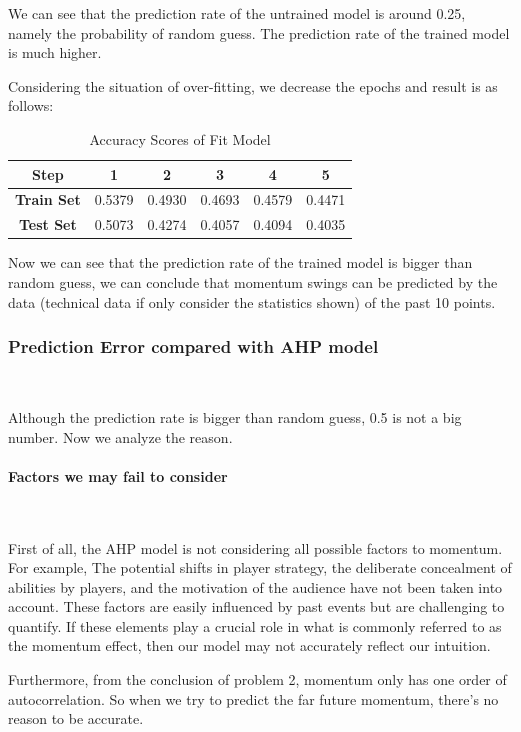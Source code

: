 We can see that the prediction rate of the untrained model is around 0.25,
namely the probability of random guess. 
The prediction rate of the trained model is much higher.

Considering the situation of over-fitting, we decrease the epochs and result is as follows:

\begin{table}[H]
    \centering
    \begin{tabular}{cccccc}
        \toprule
        \textbf{Step} & \textbf{1} & \textbf{2} & \textbf{3} & \textbf{4} & \textbf{5} \\
        \midrule
        \textbf{Train Set} & 0.5379 & 0.4930 & 0.4693 & 0.4579 & 0.4471 \\
        \textbf{Test Set} & 0.5073 & 0.4274 & 0.4057 & 0.4094 & 0.4035 \\
        \bottomrule
    \end{tabular}
    \caption{Accuracy Scores of Fit Model}
    \label{tab:predict_rate_fit}
\end{table}

Now we can see that the prediction rate of the trained model is bigger than random guess,
we can conclude that momentum swings can be predicted by the data 
(technical data if only consider the statistics shown) of the past 10 points.


\subsubsection{Prediction Error compared with AHP model}~{}

Although the prediction rate is bigger than random guess, 0.5 is not a big number.
Now we analyze the reason.

\paragraph{Factors we may fail to consider}~{}

First of all, the AHP model is not considering all possible factors to momentum.
For example, The potential shifts in player strategy, the deliberate concealment of abilities by players,
and the motivation of the audience have not been taken into account. 
These factors are easily influenced by past events but are challenging to quantify.
If these elements play a crucial role in what is commonly referred to as the momentum effect,
then our model may not accurately reflect our intuition.

Furthermore, from the conclusion of problem 2, momentum only has one order of autocorrelation.
So when we try to predict the far future momentum, there's no reason to be accurate.

